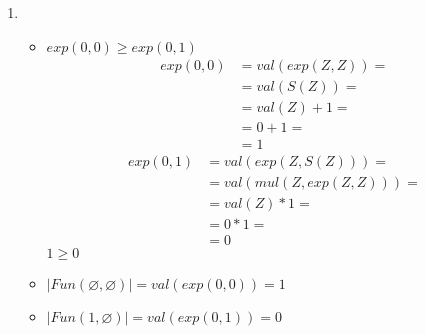 \documentclass{article}
\begin{document}
\begin{enumerate}
    \item \begin{itemize}
              \item \(exp(0,0) \geq exp(0,1)\)
                    \begin{align*}
                        exp(0,0) & = val(exp(Z,Z)) = \\
                                 & = val(S(Z)) =     \\
                                 & = val(Z) + 1 =    \\
                                 & = 0 + 1 =         \\
                                 & = 1
                    \end{align*}
                    \begin{align*}
                        exp(0,1) & = val(exp(Z,S(Z))) =      \\
                                 & = val(mul(Z, exp(Z,Z))) = \\
                                 & = val(Z) * 1 =            \\
                                 & = 0 * 1 =                 \\
                                 & = 0
                    \end{align*}
                    \(1 \geq 0\)
              \item \(\lvert Fun(\varnothing, \varnothing) \rvert = val(exp(0,0)) = 1\)
              \item \(\lvert Fun(1, \varnothing) \rvert = val(exp(0,1)) = 0\)
          \end{itemize}
\end{enumerate}
\end{document}
